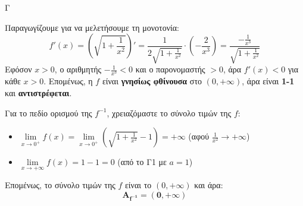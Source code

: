 \begin{thema}{Γ}
\begin{erwthma}
Παραγωγίζουμε για να μελετήσουμε τη μονοτονία:
\[ f'(x) = \left( \sqrt{1+\frac{1}{x^2}} \right)' = \frac{1}{2\sqrt{1+\frac{1}{x^2}}} \cdot \left( -\frac{2}{x^3} \right) = \frac{-\frac{1}{x^3}}{\sqrt{1+\frac{1}{x^2}}} \]
Εφόσον $x > 0$, ο αριθμητής $-\frac{1}{x^3} < 0$ και ο παρονομαστής $> 0$, άρα $f'(x) < 0$ για κάθε $x > 0$.
Επομένως, η $f$ είναι \textbf{γνησίως φθίνουσα} στο $(0, +\infty)$, άρα είναι \textbf{1-1} και \textbf{αντιστρέφεται}.

Για το πεδίο ορισμού της $f^{-1}$, χρειαζόμαστε το σύνολο τιμών της $f$:
\begin{itemize}
    \item $\lim\limits_{x \to 0^+} f(x) = \lim\limits_{x \to 0^+} \left( \sqrt{1+\frac{1}{x^2}} - 1 \right) = +\infty$ \quad (αφού $\frac{1}{x^2} \to +\infty$)
    \item $\lim\limits_{x \to +\infty} f(x) = 1 - 1 = 0$ \quad (από το Γ1 με $a=1$)
\end{itemize}
Επομένως, το σύνολο τιμών της $f$ είναι το $(0, +\infty)$ και άρα:
\[ \boldsymbol{A_{f^{-1}} = (0, +\infty)} \]
\end{erwthma}
\end{thema}

